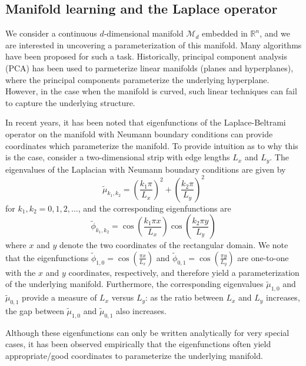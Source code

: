\documentclass[preprint]{elsarticle}
\begin{document}
\subsection{Manifold learning and the Laplace operator}

We consider a continuous $d$-dimensional manifold $\mathcal{M}_d$ embedded in $\mathbb{R}^n$, and we are interested in uncovering a parameterization of this manifold. 
%
Many algorithms have been proposed for such a task.
%
Historically, principal component analysis (PCA) \cite{shlens2005tutorial} has been used to parmeterize linear manifolds (planes and hyperplanes), where the principal components parameterize the underlying hyperplane.
%
However, in the case when the manifold is curved, such linear techniques can fail to capture the underlying structure. 

In recent years, it has been noted that eigenfunctions of the Laplace-Beltrami operator on the manifold with Neumann boundary conditions \cite{....} can provide coordinates which parameterize the manifold. 
%
To provide intuition as to why this is the case, consider a two-dimensional strip with edge lengths $L_x$ and $L_y$. 
%
The eigenvalues of the Laplacian with Neumann boundary conditions are given by
\begin{equation}
\tilde{\mu}_{k_1, k_2} = \left( \frac{k_1 \pi}{L_x} \right)^2 + \left( \frac{k_2 \pi}{L_y} \right)^2
\end{equation}
for $k_1, k_2 = 0, 1, 2, \dots$,
and the corresponding eigenfunctions are 
\begin{equation}
\tilde{\phi}_{k_1, k_2} = \cos \left( \frac{k_1 \pi x}{L_x} \right) \cos \left( \frac{k_2 \pi y}{L_y} \right)
\end{equation}
where $x$ and $y$ denote the two coordinates of the rectangular domain. 
%
We note that the eigenfunctions $\tilde{\phi}_{1, 0} = \cos \left( \frac{\pi x}{L_x} \right)$ and $\tilde{\phi}_{0, 1} = \cos \left( \frac{\pi y}{L_y} \right)$ are one-to-one with the $x$ and $y$ coordinates, respectively, and therefore yield a parameterization of the underlying manifold. 
%
Furthermore, the corresponding eigenvalues $\tilde{\mu}_{1,0}$ and $\tilde{\mu}_{0,1}$ provide a measure of $L_x$ versus $L_y$: as the ratio between $L_x$ and $L_y$ increases, the gap between $\tilde{\mu}_{1,0}$ and $\tilde{\mu}_{0,1}$ also increases.


Although these eigenfunctions can only be written analytically for very special cases, it has been observed empirically that the eigenfunctions often yield appropriate/good coordinates to parameterize the underlying manifold. 
\end{document}

